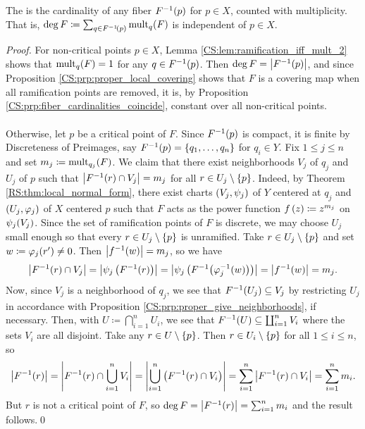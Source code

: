 \documentclass[../Moduli_Spaces_of_Riemann_Surfaces.tex]{subfiles}
\begin{document}
    \begin{defthm}\label{CS:thm:degree_sum_of_multiplicities}
        The  is the cardinality of any fiber $F^{-1}\!\left(p\right)$ for $p\in X$, counted with multiplicity. That is, $\deg F\coloneqq\sum_{q\in F^{-1}\!\left(p\right)}\operatorname{mult}_q\!\left(F\right)$ is independent of $p\in X$.
    \end{defthm}
    \begin{proof}
        For non-critical points $p\in X$, Lemma \ref{CS:lem:ramification_iff_mult_2} shows that $\operatorname{mult}_q\!\left(F\right)=1$ for any $q\in F^{-1}\!\left(p\right)$. Then $\deg F=\left|F^{-1}\!\left(p\right)\right|$, and since Proposition \ref{CS:prp:proper_local_covering} shows that $F$ is a covering map when all ramification points are removed, it is, by Proposition \ref{CS:prp:fiber_cardinalities_coincide}, constant over all non-critical points.\\\ \\
        Otherwise, let $p$ be a critical point of $F$. Since $F^{-1}\!\left(p\right)$ is compact, it is finite by Discreteness of Preimages, say $F^{-1}\!\left(p\right)=\left\{q_1,\dots,q_n\right\}$ for $q_i\in Y$. Fix $1\leq j\leq n$ and set $m_j\coloneqq\operatorname{mult}_{q_j}\!\left(F\right)$. We claim that there exist neighborhoods $V_j$ of $q_j$ and $U_j$ of $p$ such that $\left|F^{-1}\!\left(r\right)\cap V_j\right|=m_j$ for all $r\in U_j\setminus\left\{p\right\}$. Indeed, by Theorem \ref{RS:thm:local_normal_form}, there exist charts $\left(V_j,\psi_j\right)$ of $Y$ centered at $q_j$ and $\left(U_j,\varphi_j\right)$ of $X$ centered $p$ such that $F$ acts as the power function $f\left(z\right)\coloneqq z^{m_j}$ on $\psi_j\!\left(V_j\right)$. Since the set of ramification points of $F$ is discrete, we may choose $U_j$ small enough so that every $r\in U_j\setminus\left\{p\right\}$ is unramified. Take $r\in U_j\setminus\left\{p\right\}$ and set $w\coloneqq\varphi_j\!\left(r'\right)\neq0$. Then $\left|f^{-1}\!\left(w\right)\right|=m_j$, so we have
        \begin{equation*}
            \left|F^{-1}\!\left(r\right)\cap V_j\right|=\left|\psi_j\left(F^{-1}\!\left(r\right)\right)\right|=\left|\psi_j\left(F^{-1}\!\left(\varphi_j^{-1}\!\left(w\right)\right)\right)\right|=\left|f^{-1}\!\left(w\right)\right|=m_j.
        \end{equation*}
        Now, since $V_j$ is a neighborhood of $q_j$, we see that $F^{-1}\!\left(U_j\right)\subseteq V_j$ by restricting $U_j$ in accordance with Proposition \ref{CS:prp:proper_give_neighborhoods}, if necessary. Then, with $U\coloneqq\bigcap_{i=1}^{n}U_i$, we see that $F^{-1}\!\left(U\right)\subseteq\coprod_{i=1}^{n}V_i$ where the sets $V_i$ are all disjoint. Take any $r\in U\setminus\left\{p\right\}$. Then $r\in U_i\setminus\left\{p\right\}$ for all $1\leq i\leq n$, so
        \begin{equation*}
            \left|F^{-1}\!\left(r\right)\right|=\left|F^{-1}\!\left(r\right)\cap\bigcup_{i=1}^{n}V_i\right|=\left|\bigcup_{i=1}^{n}\left(F^{-1}\!\left(r\right)\cap V_i\right)\right|=\sum_{i=1}^{n}\left|F^{-1}\!\left(r\right)\cap V_i\right|=\sum_{i=1}^{n}m_i.
        \end{equation*}
        But $r$ is not a critical point of $F$, so $\deg F=\left|F^{-1}\!\left(r\right)\right|=\sum_{i=1}^{n}m_i$ and the result follows.\qed
    \end{proof}
\end{document}
